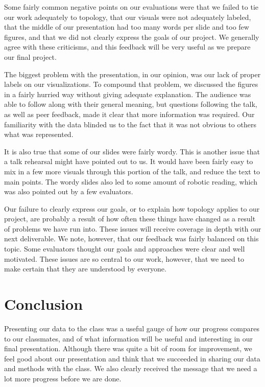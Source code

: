 \documentclass[11pt]{article}
\begin{document}
Some fairly common negative points on our evaluations were that we failed to
tie our work adequately to topology, that our visuals were not adequately labeled, that
the middle of our presentation had too many words per slide and too few figures, and that
we did not clearly express the goals of our project. We generally agree with these
criticisms, and this feedback will be very useful as we prepare our final project.

The biggest problem with the presentation, in our opinion, was our lack of proper
labels on our visualizations. To compound that problem, we discussed the figures in
a fairly hurried way without giving adequate explanation. The audience was able to
follow along with their general meaning, but questions following the talk, as well
as peer feedback, made it clear that more information was required. Our familiarity
with the data blinded us to the fact that it was not obvious to others what was
represented.

It is also true that some of our slides were fairly wordy. This is another issue
that a talk rehearsal might have pointed out to us. It would have been fairly easy to
mix in a few more visuals through this portion of the talk, and reduce the text
to main points. The wordy slides also led to some amount of robotic reading, which
was also pointed out by a few evaluators.

Our failure to clearly express our goals, or to explain how topology applies to
our project, are probably a result of how often these things have changed as
a result of problems we have run into. These issues will receive coverage in depth
with our next deliverable. We note, however, that our feedback was fairly
balanced on this topic. Some evaluators thought our goals and approaches were
clear and well motivated. These issues are so central to our work, however, that
we need to make certain that they are understood by everyone.

\section*{Conclusion}

Presenting our data to the class was a useful gauge of how our progress compares
to our classmates, and of what information will be useful and interesting in our
final presentation. Although there was quite a bit of room for improvement, we
feel good about our presentation and think that we succeeded in sharing our data
and methods with the class. We also clearly received the message that we need
a lot more progress before we are done.
\end{document}

